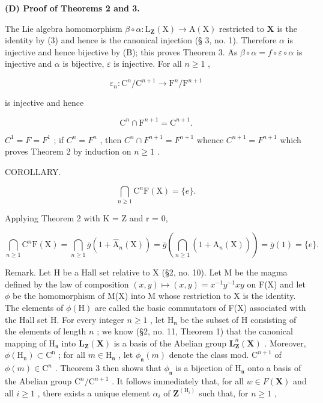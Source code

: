 \textbf{(D) Proof of Theorems 2 and 3.}

The Lie algebra homomorphism \(\beta \circ \alpha: \mathrm{L}_{\mathbf{Z}}(\mathrm{X}) \to \mathrm{A}(\mathrm{X})\) restricted to \(\mathbf{X}\) is the identity by (3) and hence is the canonical injection (§ 3, no. 1). Therefore \(\alpha\) is injective and hence bijective by (B); this proves Theorem 3. As \(\beta \circ \alpha = f \circ \varepsilon \circ \alpha\) is injective and \(\alpha\) is bijective, \(\varepsilon\) is injective. For all \(n \geqslant 1\) ,

\[
\varepsilon_ {n} \colon \mathrm{C} ^ {n} / \mathrm{C} ^ {n + 1} \rightarrow \mathrm{F} ^ {n} / \mathrm{F} ^ {n + 1}
\]

is injective and hence

\[
\mathrm{C} ^ {n} \cap \mathrm{F} ^ {n + 1} = \mathrm{C} ^ {n + 1}.
\]

\(C^{1} = F = F^{1}\) ; if \(C^{n} = F^{n}\) , then \(C^{n} \cap F^{n+1} = F^{n+1}\) whence \(C^{n+1} = F^{n+1}\) which proves Theorem 2 by induction on \(n \geqslant 1\) .

COROLLARY.

\[
\bigcap_ {n \geqslant 1} \mathrm{C} ^ {n} \mathrm{F} (\mathrm{X}) = \{e \}.
\]

Applying Theorem 2 with K = Z and r = 0,

\[
\bigcap_ {n \geqslant 1} \mathrm{C} ^ {n} \mathrm{F} (\mathrm{X}) = \bigcap_ {n \geqslant 1} \bar {g} (1 + \hat {\mathrm{A}} _ {n} (\mathrm{X})) = \bar {g} \left(\bigcap_ {n \geqslant 1} (1 + \hat {\mathrm{A}} _ {n} (\mathrm{X}))\right) = \bar {g} (1) = \{e \}.
\]

Remark. Let H be a Hall set relative to X (§2, no. 10). Let M be the magma defined by the law of composition \((x,y)\mapsto (x,y) = x^{-1}y^{-1}xy\) on F(X) and let \(\phi\) be the homomorphism of M(X) into M whose restriction to X is the identity. The elements of \(\phi (\mathrm{H})\) are called the basic commutators of F(X) associated with the Hall set H. For every integer \(n\geqslant 1\) , let \(\mathrm{H}_{\mathfrak{n}}\) be the subset of H consisting of the elements of length \(n\) ; we know (§2, no. 11, Theorem 1) that the canonical mapping of \(\mathrm{H}_{\mathfrak{n}}\) into \(\mathbf{L}_{\mathbf{Z}}(\mathbf{X})\) is a basis of the Abelian group \(\mathbf{L}_{\mathbf{Z}}^{n} (\mathbf{X})\) . Moreover, \(\phi (\mathrm{H_n})\subset \mathrm{C^n}\) ; for all \(m\in \mathrm{H}_{\mathfrak{n}}\) , let \(\phi_{\mathfrak{n}}(m)\) denote the class mod. \(\mathrm{C}^{n + 1}\) of \(\phi (m)\in \mathrm{C}^n\) . Theorem 3 then shows that \(\phi_{\mathfrak{n}}\) is a bijection of \(\mathrm{H}_{\mathfrak{n}}\) onto a basis of the Abelian group \(\mathrm{C}^n /\mathrm{C}^{n + 1}\) . It follows immediately that, for all \(w\in F(\mathbf{X})\) and all \(i\geqslant 1\) , there exists a unique element \(\alpha_{i}\) of \(\mathbf{Z}^{(\mathrm{H}_{i})}\) such that, for \(n\geqslant 1\) ,

